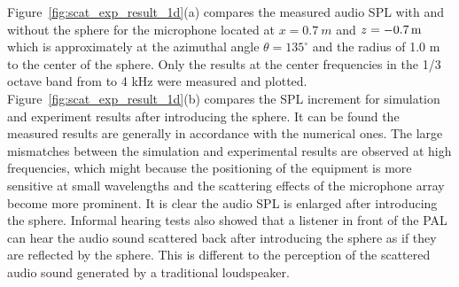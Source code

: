 Figure~\ref{fig:scat_exp_result_1d}(a) compares the measured audio SPL with and without the sphere for the microphone located at $x = \SI{0.7}{m}$ and $z = \SI{- 0.7 }{m}$ which is approximately at the azimuthal angle $\theta = 135^\circ$ and the radius of 1.0 m to the center of the sphere. 
Only the results at the center frequencies in the 1/3 octave band from  to 4 kHz were measured and plotted. 
Figure~\ref{fig:scat_exp_result_1d}(b) compares the SPL increment for simulation and experiment results after introducing the sphere. 
It can be found the measured results are generally in accordance with the numerical ones. 
The large mismatches between the simulation and experimental results are observed at high frequencies, which might because the positioning of the equipment is more sensitive at small wavelengths and the scattering effects of the microphone array become more prominent. 
It is clear the audio SPL is enlarged after introducing the sphere. Informal hearing tests also showed that a listener in front of the PAL can hear the audio sound scattered back after introducing the sphere as if they are reflected by the sphere. This is different to the perception of the scattered audio sound generated by a traditional loudspeaker. 

